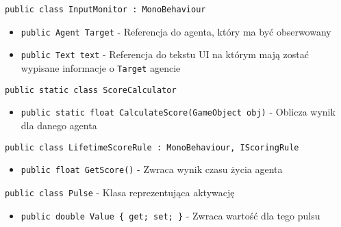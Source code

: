 \documentclass[12pt,a4paper]{article}
\begin{document}
\lstinline{public class InputMonitor : MonoBehaviour}
\begin{itemize}
    \item \lstinline|public Agent Target| - Referencja do agenta, który ma być obserwowany
    \item \lstinline|public Text text| - Referencja do tekstu UI na którym mają zostać wypisane informacje o \lstinline{Target} agencie
\end{itemize}


\lstinline{public static class ScoreCalculator}
\begin{itemize}
    \item \lstinline|public static float CalculateScore(GameObject obj)| - Oblicza wynik dla danego agenta
\end{itemize}


\lstinline{public class LifetimeScoreRule : MonoBehaviour, IScoringRule}
\begin{itemize}
    \item \lstinline|public float GetScore()| - Zwraca wynik czasu życia agenta
\end{itemize}


\lstinline{public class Pulse} - Klasa reprezentująca aktywację
\begin{itemize}
    \item \lstinline|public double Value { get; set; }| - Zwraca wartość dla tego pulsu 
\end{itemize}
\end{document}
